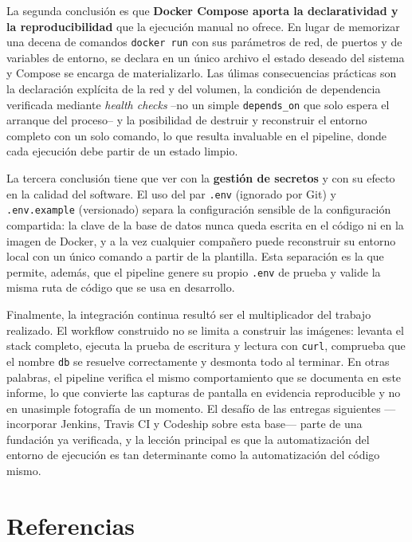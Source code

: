\documentclass[12pt,a4paper]{article}
\begin{document}
La segunda conclusi\'on es que \textbf{Docker Compose aporta la declaratividad y la
reproducibilidad} que la ejecuci\'on manual no ofrece. En lugar de memorizar una decena de
comandos \texttt{docker run} con sus par\'ametros de red, de puertos y de variables de
entorno, se declara en un \'unico archivo el estado deseado del sistema y Compose se
encarga de materializarlo. Las \'ulimas consecuencias pr\'acticas son la declaraci\'on
expl\'icita de la red y del volumen, la condici\'on de dependencia verificada mediante
\emph{health checks} --no un simple \texttt{depends\_on} que solo espera el arranque del
proceso-- y la posibilidad de destruir y reconstruir el entorno completo con un solo
comando, lo que resulta invaluable en el pipeline, donde cada ejecuci\'on debe partir de un
estado limpio.

La tercera conclusi\'on tiene que ver con la \textbf{gesti\'on de secretos} y con su
efecto en la calidad del software. El uso del par \texttt{.env} (ignorado por Git) y
\texttt{.env.example} (versionado) separa la configuraci\'on sensible de la
configuraci\'on compartida: la clave de la base de datos nunca queda escrita en el
c\'odigo ni en la imagen de Docker, y a la vez cualquier compa\~nero puede reconstruir su
entorno local con un \'unico comando a partir de la plantilla. Esta separaci\'on es la que
permite, adem\'as, que el pipeline genere su propio \texttt{.env} de prueba y valide la
misma ruta de c\'odigo que se usa en desarrollo.

Finalmente, la integraci\'on continua result\'o ser el multiplicador del trabajo
realizado. El workflow construido no se limita a construir las im\'agenes: levanta el
stack completo, ejecuta la prueba de escritura y lectura con \texttt{curl}, comprueba que
el nombre \texttt{db} se resuelve correctamente y desmonta todo al terminar. En otras
palabras, el pipeline verifica el mismo comportamiento que se documenta en este informe, lo
que convierte las capturas de pantalla en evidencia reproducible y no en unasimple
fotograf\'ia de un momento. El desaf\'io de las entregas siguientes ---incorporar Jenkins,
Travis CI y Codeship sobre esta base--- parte de una fundaci\'on ya verificada, y la
lecci\'on principal es que la automatizaci\'on del entorno de ejecuci\'on es tan
determinante como la automatizaci\'on del c\'odigo mismo.

\section*{Referencias}
\end{document}

